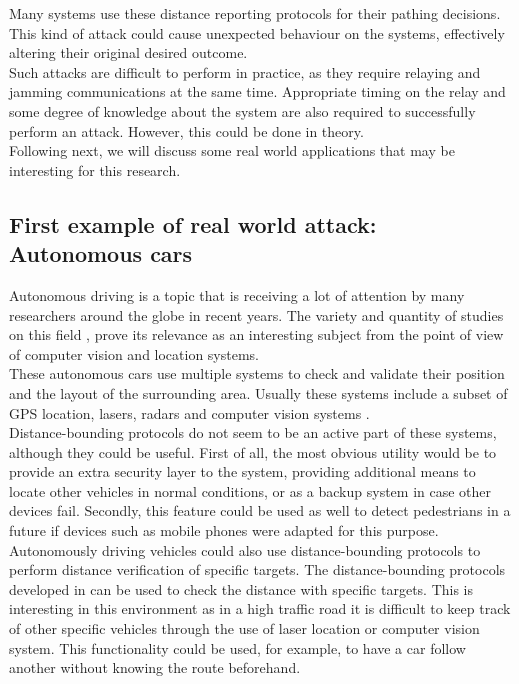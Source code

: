 \documentclass{article}
\begin{document}
Many systems use these distance reporting protocols for their pathing decisions. This kind of attack could cause unexpected behaviour on the systems, effectively altering their original desired outcome.\\

Such attacks are difficult to perform in practice, as they require relaying and jamming communications at the same time. Appropriate timing on the relay and some degree of knowledge about the system are also required to successfully perform an attack. However, this could be done in theory.\\

Following next, we will discuss some real world applications that may be interesting for this research.\\

\subsection{First example of real world attack: Autonomous cars}

Autonomous driving is a topic that is receiving a lot of attention by many researchers around the globe in recent years. The variety and quantity of studies on this field \cite{continentalautonomous, franke1999autonomous, geiger2012we, levinsontowards}, prove its relevance as an interesting subject from the point of view of computer vision and location systems.\\

These autonomous cars use multiple systems to check and validate their position and the layout of the surrounding area. Usually these systems include a subset of GPS location, lasers, radars and computer vision systems \cite{continentalautonomous,levinsontowards}.\\

Distance-bounding protocols do not seem to be an active part of these systems, although they could be useful. First of all, the most obvious utility would be to provide an extra security layer to the system, providing additional means to locate other vehicles in normal conditions, or as a backup system in case other devices fail. Secondly, this feature could be used as well to detect pedestrians in a future if devices such as mobile phones were adapted for this purpose.\\

Autonomously driving vehicles could also use distance-bounding protocols to perform distance verification of specific targets. The distance-bounding protocols developed in  \cite{capkun2006secure, rasmussen2010realization} can be used to check the distance with specific targets. This is interesting in this environment as in a high traffic road it is difficult to keep track of other specific vehicles through the use of laser location or computer vision system. This functionality could be used, for example, to have a car follow another without knowing the route beforehand.\\
\end{document}
